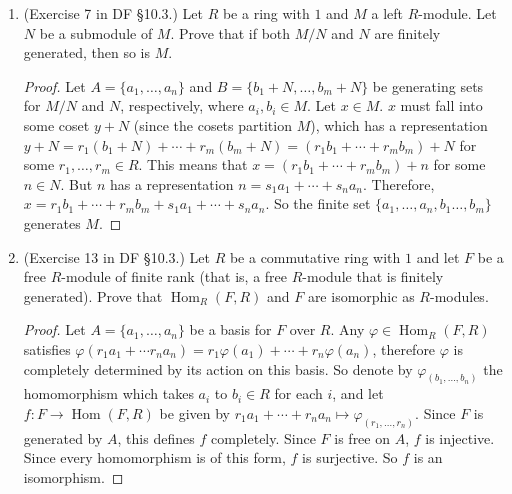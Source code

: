 \documentclass[10pt]{article}
\DeclareMathOperator*{\Hom}{Hom}
\begin{document}
\begin{enumerate}
\item (Exercise 7 in DF \S 10.3.) Let $R$ be a ring with $1$ and $M$ a left $R$-module.  Let $N$ be a submodule of $M$.  Prove that if both $M/N$ and $N$ are finitely generated, then so is $M$.

\begin{proof}
Let $A = \{a_1 , \dots , a_n \}$ and $B = \{b_1 + N, \dots , b_m + N \}$ be generating sets for $M/N$ and $N$, respectively, where $a_i, b_i \in M$.  Let $x \in M$.  $x$ must fall into some coset $y + N$ (since the cosets partition $M$), which has a representation $y + N = r_1(b_1+N) + \cdots + r_m(b_m+N) = (r_1b_1 + \cdots +r_mb_m) + N$ for some $r_1, \dots , r_m \in R$.  This means that $x = (r_1b_1 + \cdots + r_mb_m) + n$ for some $n \in N$.  But $n$ has a representation $n = s_1a_1 + \cdots + s_na_n$.  Therefore, $x = r_1b_1 + \cdots + r_mb_m + s_1a_1 + \cdots + s_na_n$.  So the finite set $\{a_1, \dots , a_n, b_1 \dots , b_m \}$ generates $M$.
\end{proof}

\item (Exercise 13 in DF \S 10.3.) Let $R$ be a commutative ring with $1$ and let $F$ be a free $R$-module of finite rank (that is, a free $R$-module that is finitely generated).  Prove that $\Hom_R(F,R)$ and $F$ are isomorphic as $R$-modules.

\begin{proof}
Let $A = \{a_1, \dots , a_n \}$ be a basis for $F$ over $R$.  Any $\varphi \in \Hom_R(F,R)$ satisfies $\varphi(r_1a_1 + \cdots r_na_n) = r_1\varphi(a_1) + \cdots + r_n\varphi(a_n)$, therefore $\varphi$ is completely determined by its action on this basis.  So denote by $\varphi_{(b_1, \dots , b_n)}$ the homomorphism which takes $a_i$ to $b_i \in R$ for each $i$, and let $f: F \rightarrow \Hom(F,R)$ be given by $r_1a_1 + \cdots + r_na_n \mapsto \varphi_{(r_1, \dots , r_n)}$.  Since $F$ is generated by $A$, this defines $f$ completely.  Since $F$ is free on $A$, $f$ is injective.  Since every homomorphism is of this form, $f$ is surjective.  So $f$ is an isomorphism.
\end{proof}

\end{enumerate}
\end{document}
